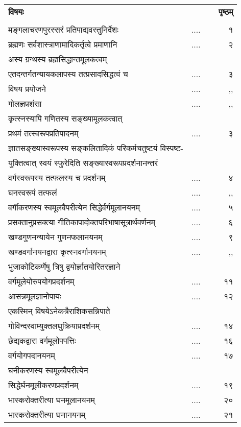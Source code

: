 \documentclass[11pt, openany]{book}
\begin{document}
\begin{tabular}{lp{2cm}p{.2cm}r}
\hspace{1cm} \textbf{विषयः} &&& \textbf{पृष्ठम्} \\
&&&\\
मङ्गलाचरणपुरस्सरं प्रतिपाद्यवस्तुनिर्देशः & .... && ~ १\\
ब्रह्मणः सर्वशास्त्राणामादिकर्तृत्वे प्रमाणानि  & ....&& ~  २\\
अस्य ग्रन्थस्य ब्रह्मसिद्धान्तमूलकत्वम् \\ एतदन्तर्गतन्यायकलापस्य तत्प्रसादसिद्धत्वं च  & ....&& ~  ३\\
विषय प्रयोजने  & ....&&  ,,\\
गोलज्ञप्रशंसा  & ....&&  ~ ,,\\
कृत्स्नस्यापि गणितस्य सङ्ख्यामूलकत्वात् \\ प्रथमं तत्स्वरूपप्रतिपादनम्  & ....&& ~ ३\\
ज्ञातसङ्ख्यास्वरूपस्य सङ्कलितादिकं परिकर्मचतुष्टयं विस्पष्ट- 
\\ युक्तित्वात् स्वयं स्फुरेदिति सङ्ख्यास्वरूपप्रदर्शनानन्तरं 
 \\ वर्गस्वरूपस्य तत्फलस्य च प्रदर्शनम्   & ....&&  ~  ४\\
घनस्वरूपं तत्फलं  & ....&&  ~ ,,\\
वर्गीकरणस्य स्वमूलवैपरीत्येन सिद्धेर्वर्गमूलानयनम्  & ....&&  ~ ५\\
प्रसक्तानुप्रसक्त्या गीतिकापादोक्तपरिभाषासूत्रार्थवर्णनम्  & ....&&  ~  ६\\
खण्डगुणनन्यायेन गुणनफलानयनम्  & ....&& ~ ९\\
खण्डवर्गानयनद्वारा कृत्स्नवर्गानयनम्   & ....&&  ~ ,,\\
भुजाकोटिकर्णेषु त्रिषु द्वयोर्ज्ञातयोरितरज्ञाने \\ वर्गमूलेयोरुपयोगप्रदर्शनम्  & ....&&  ~  ११\\
 आसन्नमूलज्ञानोपायः  & ....&&  ~ १२\\
एकस्मिन् विषयेऽनेकत्रैराशिकसन्निपाते \\ गोविन्दस्वाम्युक्तलघुक्रियाप्रदर्शनम्  
 & ....&&  ~ १४\\
छेद्यकद्वारा वर्गमूलोपपत्तिः  & ....&& ~ १६\\
वर्गयोगपदानयनम्  & ....&&  ~ १७\\
घनीकरणस्य स्वमूलवैपरीत्येन \\ सिद्धेर्घनमूलीकरणप्रदर्शनम् & ....&&  ~ १९\\
भास्करोक्तरीत्या घनमूलानयनम्   & ....&&  ~  २०\\
भास्करोक्तरीत्या घनानयनम्   & ....&&  ~ २१ \\

\end{tabular}
\end{document}
